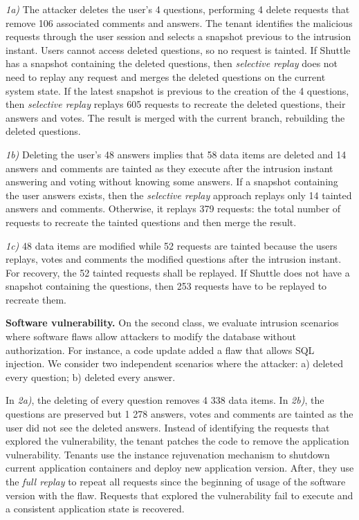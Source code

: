 \documentclass[10pt,conference]{IEEEtran}
\begin{document}
\textit{1a)} The attacker deletes the user's 4 questions, performing 4 delete requests that remove 106 associated comments and answers. The tenant identifies the malicious requests through the user session and selects a snapshot previous to the intrusion instant. Users cannot access deleted questions, so no request is tainted. If Shuttle has a snapshot containing the deleted questions, then \textit{selective replay} does not need to replay any request and merges the deleted questions on the current system state. If the latest snapshot is previous to the creation of the 4 questions, then \textit{selective replay} replays 605 requests to recreate the deleted questions, their answers and votes. The result is merged with the current branch, rebuilding the deleted questions. 

\textit{1b)} Deleting the user's 48 answers implies that 58 data items are deleted and 14 answers and comments are tainted as they execute after the intrusion instant answering and voting without knowing some answers. If a snapshot containing the user answers exists, then the \textit{selective replay} approach replays only 14 tainted answers and comments. Otherwise, it replays 379 requests: the total number of requests to recreate the tainted questions and then merge the result.


\textit{1c)} 48 data items are modified while 52 requests are tainted because the users replays, votes and comments the modified questions after the intrusion instant. For recovery, the 52 tainted requests shall be replayed. If Shuttle does not have a snapshot containing the questions, then 253 requests have to be replayed to recreate them. 

\textbf{Software vulnerability.}
On the second class, we evaluate intrusion scenarios where software flaws allow attackers to modify the database without authorization. For instance, a code update added a flaw that allows SQL injection. We consider two independent scenarios where the attacker: a) deleted every question; b) deleted every answer.

In \textit{2a)}, the deleting of every question removes 4 338 data items. In \textit{2b)}, the questions are preserved but 1 278 answers, votes and comments are tainted as the user did not see the deleted answers.
Instead of identifying the requests that explored the vulnerability, the tenant patches the code to remove the application vulnerability. Tenants use the instance rejuvenation mechanism to shutdown current application containers and deploy new application version. After, they use the \textit{full replay} to repeat all requests since the beginning of usage of the software version with the flaw. Requests that explored the vulnerability fail to execute and a consistent application state is recovered.
\end{document}

